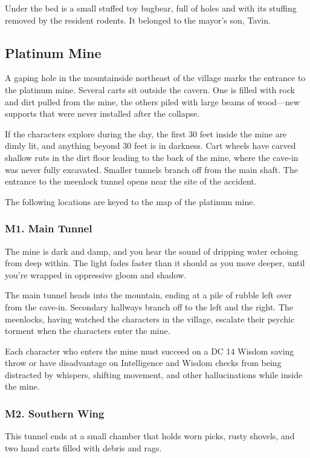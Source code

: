 \documentclass[10pt,a4paper,twoside,bg=print,twocolumn,openany,nodeprecatedcode]{dndbook}
\begin{document}
Under the bed is a small stuffed toy bugbear, full of holes and with its stuffing removed by the resident rodents. It belonged to the mayor's son, Tavin.

\subsection{Platinum Mine}
A gaping hole in the mountainside northeast of the village marks the entrance to the platinum mine. Several carts sit outside the cavern. One is filled with rock and dirt pulled from the mine, the others piled with large beams of wood—new supports that were never installed after the collapse.

If the characters explore during the day, the first 30 feet inside the mine are dimly lit, and anything beyond 30 feet is in darkness. Cart wheels have carved shallow ruts in the dirt floor leading to the back of the mine, where the cave-in was never fully excavated. Smaller tunnels branch off from the main shaft. The entrance to the meenlock tunnel opens near the site of the accident.

The following locations are keyed to the map of the platinum mine.

\subsubsection{M1. Main Tunnel}
\begin{DndReadAloud}{}
The mine is dark and damp, and you hear the sound of dripping water echoing from deep within. The light fades faster than it should as you move deeper, until you're wrapped in oppressive gloom and shadow.

\end{DndReadAloud}

The main tunnel heads into the mountain, ending at a pile of rubble left over from the cave-in. Secondary hallways branch off to the left and the right. The meenlocks, having watched the characters in the village, escalate their psychic torment when the characters enter the mine.

Each character who enters the mine must succeed on a DC 14 Wisdom saving throw or have disadvantage on Intelligence and Wisdom checks from being distracted by whispers, shifting movement, and other hallucinations while inside the mine.

\subsubsection{M2. Southern Wing}
\begin{DndReadAloud}{}
This tunnel ends at a small chamber that holds worn picks, rusty shovels, and two hand carts filled with debris and rags.

\end{DndReadAloud}
\end{document}
